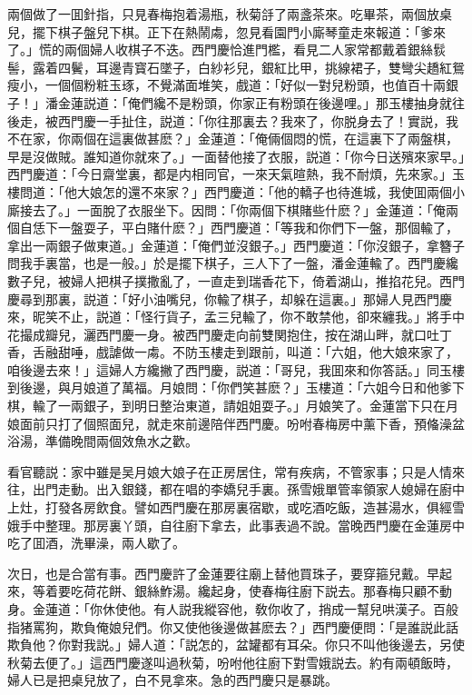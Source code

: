 兩個做了一囬針指，只見春梅抱着湯瓶，秋菊㧱了兩盞茶來。吃畢茶，兩個放桌兒，擺下棋子盤兒下棋。正下在熱鬧䖏，忽見看園門小廝琴童走來報道：「爹來了。」慌的兩個婦人收棋子不迭。西門慶恰進門檻，看見二人家常都戴着銀絲䯼髻，露着四鬢，耳邊青寳石墜子，白紗衫兒，銀紅比甲，挑線裙子，雙彎尖趫紅鴛瘦小，一個個粉粧玉琢，不覺滿面堆笑，戲道：「好似一對兒粉頭，也值百十兩銀子！」潘金蓮説道：「俺們纔不是粉頭，你家正有粉頭在後邊哩。」那玉樓抽身就往後走，被西門慶一手扯住，説道：「你往那裏去？我來了，你脱身去了！實説，我不在家，你兩個在這裏做甚麽？」金蓮道：「俺倆個悶的慌，在這裏下了兩盤棋，早是沒做賊。誰知道你就來了。」一面替他接了衣服，説道：「你今日送殯來家早。」西門慶道：「今日齋堂裏，都是内相同官，一來天氣暄熱，我不耐煩，先來家。」玉樓問道：「他大娘怎的還不來家？」西門慶道：「他的轎子也待進城，我使囬兩個小廝接去了。」一面脫了衣服坐下。因問：「你兩個下棋賭些什麽？」金蓮道：「俺兩個自恁下一盤耍子，平白賭什麽？」西門慶道：「等我和你們下一盤，那個輸了，拿出一兩銀子做東道。」金蓮道：「俺們並沒銀子。」西門慶道：「你沒銀子，拿簪子問我手裏當，也是一般。」於是擺下棋子，三人下了一盤，潘金蓮輸了。西門慶纔數子兒，被婦人把棋子撲撒亂了，一直走到瑞香花下，倚着湖山，推掐花兒。西門慶尋到那裏，説道：「好小油嘴兒，你輸了棋子，却躲在這裏。」那婦人見西門慶來，昵笑不止，説道：「怪行貨子，孟三兒輸了，你不敢禁他，卻來纏我。」將手中花撮成瓣兒，灑西門慶一身。被西門慶走向前雙関抱住，按在湖山畔，就口吐丁香，舌融甜唾，戲謔做一䖏。不防玉樓走到跟前，叫道：「六姐，他大娘來家了，咱後邊去來！」這婦人方纔撇了西門慶，説道：「哥兒，我囬來和你答話。」同玉樓到後邊，與月娘道了萬福。月娘問：「你們笑甚麽？」玉樓道：「六姐今日和他爹下棋，輸了一兩銀子，到明日整治東道，請姐姐耍子。」月娘笑了。金蓮當下只在月娘面前只打了個照面兒，就走來前邊陪伴西門慶。吩咐春梅房中薰下香，預偹澡盆浴湯，準備晚間兩個效魚水之歡。

看官聽説：家中雖是吴月娘大娘子在正房居住，常有疾病，不管家事；只是人情來往，出門走動。出入銀錢，都在唱的李嬌兒手裏。孫雪娥單管率領家人媳婦在廚中上灶，打發各房飲食。譬如西門慶在那房裏宿歇，或吃酒吃飯，造甚湯水，俱經雪娥手中整理。那房裏丫頭，自往廚下拿去，此事表過不說。當晚西門慶在金蓮房中吃了囬酒，洗畢澡，兩人歇了。

次日，也是合當有事。西門慶許了金蓮要往廟上替他買珠子，要穿箍兒戴。早起來，等着要吃荷花餅、銀絲鮓湯。纔起身，使春梅往廚下説去。那春梅只顧不動身。金蓮道：「你休使他。有人説我縱容他，敎你收了，捎成一幫兒哄漢子。百般指猪罵狗，欺負俺娘兒們。你又使他後邊做甚麽去？」西門慶便問：「是誰説此話欺負他？你對我説。」婦人道：「説怎的，盆罐都有耳朵。你只不叫他後邊去，另使秋菊去便了。」這西門慶遂叫過秋菊，吩咐他往廚下對雪娥説去。約有兩頓飯時，婦人已是把桌兒放了，白不見拿來。急的西門慶只是暴跳。

